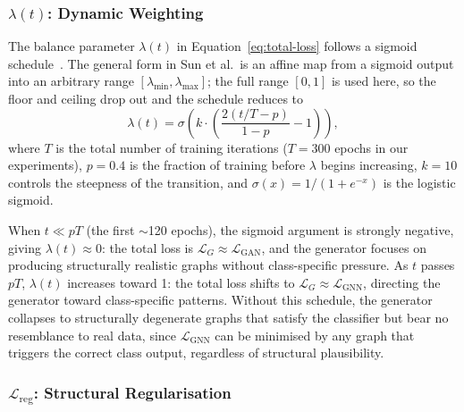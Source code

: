 \documentclass[12pt,a4paper]{article}
\begin{document}
\subsubsection{$\lambda(t)$: Dynamic Weighting}

The balance parameter $\lambda(t)$ in Equation~\eqref{eq:total-loss} follows a sigmoid schedule~\cite{sun2025gingraph}. The general form in Sun et al.\ is an affine map from a sigmoid output into an arbitrary range $[\lambda_{\min}, \lambda_{\max}]$; the full range $[0, 1]$ is used here, so the floor and ceiling drop out and the schedule reduces to
\begin{equation}
  \lambda(t) = \sigma\!\left(k \cdot \left(\frac{2(t/T - p)}{1-p} - 1\right)\right),
  \label{eq:lambda}
\end{equation}
where $T$ is the total number of training iterations ($T = 300$ epochs in our experiments), $p = 0.4$ is the fraction of training before $\lambda$ begins increasing, $k = 10$ controls the steepness of the transition, and $\sigma(x) = 1/(1 + e^{-x})$ is the logistic sigmoid.

When $t \ll pT$ (the first $\sim$120 epochs), the sigmoid argument is strongly negative, giving $\lambda(t) \approx 0$: the total loss is $\mathcal{L}_G \approx \mathcal{L}_{\text{GAN}}$, and the generator focuses on producing structurally realistic graphs without class-specific pressure. As $t$ passes $pT$, $\lambda(t)$ increases toward 1: the total loss shifts to $\mathcal{L}_G \approx \mathcal{L}_{\text{GNN}}$, directing the generator toward class-specific patterns. Without this schedule, the generator collapses to structurally degenerate graphs that satisfy the classifier but bear no resemblance to real data, since $\mathcal{L}_{\text{GNN}}$ can be minimised by any graph that triggers the correct class output, regardless of structural plausibility.

\subsubsection{$\mathcal{L}_{\text{reg}}$: Structural Regularisation}
\end{document}
